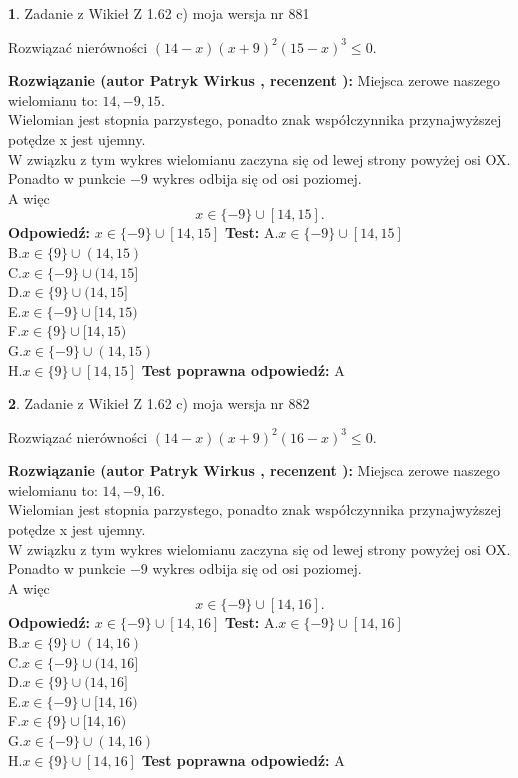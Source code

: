 \documentclass[12pt, a4paper]{article}
\theoremstyle{definition} %
\newtheorem{zad}{}
\newcommand{\zadStart}[1]{\begin{zad}#1\newline}
\newcommand{\zadStop}{\end{zad}}
\newcommand{\rozwStart}[2]{\noindent \textbf{Rozwiązanie (autor #1 , recenzent #2): }\newline}
\newcommand{\rozwStop}{\newline}
\newcommand{\odpStart}{\noindent \textbf{Odpowiedź:}\newline}
\newcommand{\odpStop}{\newline}
\newcommand{\testStart}{\noindent \textbf{Test:}\newline}
\newcommand{\testStop}{\newline}
\newcommand{\kluczStart}{\noindent \textbf{Test poprawna odpowiedź:}\newline}
\newcommand{\kluczStop}{\newline}
\begin{document}
\zadStart{Zadanie z Wikieł Z 1.62 c) moja wersja nr 881}

Rozwiązać nierówności $(14-x)(x+9)^{2}(15-x)^{3}\le0$.
\zadStop
\rozwStart{Patryk Wirkus}{}
Miejsca zerowe naszego wielomianu to: $14, -9, 15$.\\
Wielomian jest stopnia parzystego, ponadto znak współczynnika przy\linebreak najwyższej potędze x jest ujemny.\\ W związku z tym wykres wielomianu zaczyna się od lewej strony powyżej osi OX.\\
Ponadto w punkcie $-9$ wykres odbija się od osi poziomej.\\
A więc $$x \in \{-9\} \cup [14,15].$$
\rozwStop
\odpStart
$x \in \{-9\} \cup [14,15]$
\odpStop
\testStart
A.$x \in \{-9\} \cup [14,15]$\\
B.$x \in \{9\} \cup (14,15)$\\
C.$x \in \{-9\} \cup (14,15]$\\
D.$x \in \{9\} \cup (14,15]$\\
E.$x \in \{-9\} \cup [14,15)$\\
F.$x \in \{9\} \cup [14,15)$\\
G.$x \in \{-9\} \cup (14,15)$\\
H.$x \in \{9\} \cup [14,15]$
\testStop
\kluczStart
A
\kluczStop



\zadStart{Zadanie z Wikieł Z 1.62 c) moja wersja nr 882}

Rozwiązać nierówności $(14-x)(x+9)^{2}(16-x)^{3}\le0$.
\zadStop
\rozwStart{Patryk Wirkus}{}
Miejsca zerowe naszego wielomianu to: $14, -9, 16$.\\
Wielomian jest stopnia parzystego, ponadto znak współczynnika przy\linebreak najwyższej potędze x jest ujemny.\\ W związku z tym wykres wielomianu zaczyna się od lewej strony powyżej osi OX.\\
Ponadto w punkcie $-9$ wykres odbija się od osi poziomej.\\
A więc $$x \in \{-9\} \cup [14,16].$$
\rozwStop
\odpStart
$x \in \{-9\} \cup [14,16]$
\odpStop
\testStart
A.$x \in \{-9\} \cup [14,16]$\\
B.$x \in \{9\} \cup (14,16)$\\
C.$x \in \{-9\} \cup (14,16]$\\
D.$x \in \{9\} \cup (14,16]$\\
E.$x \in \{-9\} \cup [14,16)$\\
F.$x \in \{9\} \cup [14,16)$\\
G.$x \in \{-9\} \cup (14,16)$\\
H.$x \in \{9\} \cup [14,16]$
\testStop
\kluczStart
A
\kluczStop
\end{document}
